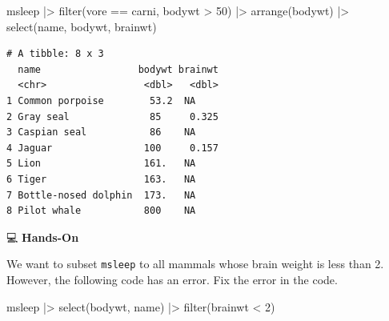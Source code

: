 \documentclass[
  letterpaper,
  DIV=11,
  numbers=noendperiod]{scrreprt}
\newenvironment{Shaded}{\begin{snugshade}}{\end{snugshade}}
\newcommand{\DecValTok}[1]{\textcolor[rgb]{0.68,0.00,0.00}{#1}}
\newcommand{\FunctionTok}[1]{\textcolor[rgb]{0.28,0.35,0.67}{#1}}
\newcommand{\NormalTok}[1]{\textcolor[rgb]{0.00,0.23,0.31}{#1}}
\newcommand{\SpecialCharTok}[1]{\textcolor[rgb]{0.37,0.37,0.37}{#1}}
\newcommand{\StringTok}[1]{\textcolor[rgb]{0.13,0.47,0.30}{#1}}
\begin{document}
\begin{tcolorbox}[enhanced jigsaw, colbacktitle=quarto-callout-tip-color!10!white, opacitybacktitle=0.6, breakable, left=2mm, leftrule=.75mm, toprule=.15mm, toptitle=1mm, bottomtitle=1mm, colframe=quarto-callout-tip-color-frame, opacityback=0, coltitle=black, arc=.35mm, titlerule=0mm, colback=white, bottomrule=.15mm, title=\textcolor{quarto-callout-tip-color}{\faLightbulb}\hspace{0.5em}{Answer}, rightrule=.15mm]

\begin{Shaded}
\begin{Highlighting}[]
\NormalTok{msleep }\SpecialCharTok{|\textgreater{}}
  \FunctionTok{filter}\NormalTok{(vore }\SpecialCharTok{==} \StringTok{\textquotesingle{}carni\textquotesingle{}}\NormalTok{, bodywt }\SpecialCharTok{\textgreater{}} \DecValTok{50}\NormalTok{) }\SpecialCharTok{|\textgreater{}}
  \FunctionTok{arrange}\NormalTok{(bodywt) }\SpecialCharTok{|\textgreater{}}
  \FunctionTok{select}\NormalTok{(name, bodywt, brainwt)}
\end{Highlighting}
\end{Shaded}

\begin{verbatim}
# A tibble: 8 x 3
  name                 bodywt brainwt
  <chr>                 <dbl>   <dbl>
1 Common porpoise        53.2  NA    
2 Gray seal              85     0.325
3 Caspian seal           86    NA    
4 Jaguar                100     0.157
5 Lion                  161.   NA    
6 Tiger                 163.   NA    
7 Bottle-nosed dolphin  173.   NA    
8 Pilot whale           800    NA    
\end{verbatim}

\end{tcolorbox}

💻 \textbf{Hands-On}

We want to subset \texttt{msleep} to all mammals whose brain weight is
less than 2. However, the following code has an error. Fix the error in
the code.

\begin{Shaded}
\begin{Highlighting}[]
\NormalTok{msleep }\SpecialCharTok{|\textgreater{}}
  \FunctionTok{select}\NormalTok{(bodywt, name) }\SpecialCharTok{|\textgreater{}}
  \FunctionTok{filter}\NormalTok{(brainwt }\SpecialCharTok{\textless{}} \DecValTok{2}\NormalTok{) }
\end{Highlighting}
\end{Shaded}
\end{document}
